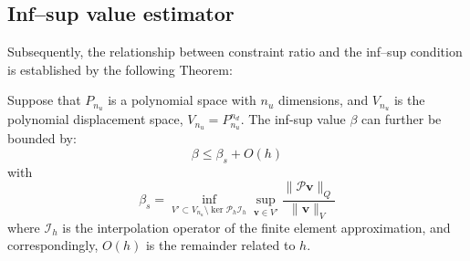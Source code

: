 \subsection{Inf--sup value estimator}
Subsequently, the relationship between constraint ratio and the inf--sup condition is established by the following Theorem:
\begin{thm}
Suppose that $P_{n_u}$ is a polynomial space with $n_u$ dimensions, and $V_{n_u}$ is the polynomial displacement space, $V_{n_u} = P_{n_u}^{n_d}$. The inf-sup value $\beta$ can further be bounded by:
\begin{equation}\label{estimator}
\beta \le \beta_s + O(h)
\end{equation}
with
\begin{equation}\label{beta_s}
\beta_s = \inf_{V' \subset V_{n_u} \setminus \ker \mathcal{P}_h \mathcal{I}_h} \sup_{\boldsymbol{v} \in V'} \frac{\|\mathcal{P} \boldsymbol{v}\|_Q}{\|\boldsymbol{v}\|_V}
\end{equation}
where $\mathcal{I}_h$ is the interpolation operator of the finite element approximation, and correspondingly, $O(h)$ is the remainder related to $h$.
\end{thm}

